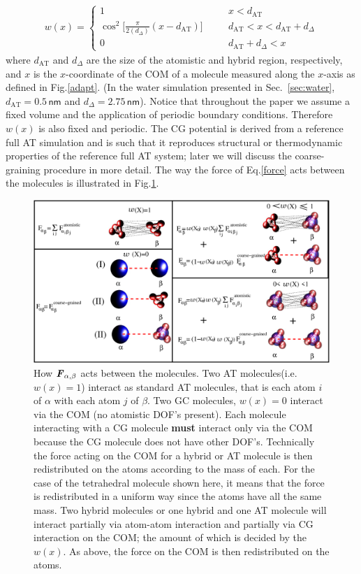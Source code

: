 \documentclass[aps,prb,preprint,citeautoscript]{revtex4}
\newcommand{\redc}[1]{{\color{black} #1}}
\renewcommand{\v}[1]{\textbf{\textit{#1}}}
\begin{document}
\begin{align}\label{eqn:old-w}
  w(x) =
  \left\{
    \begin{array}{lcl}
      1 &\quad& x < d_{\textrm{AT}}\\
      \cos^2\big[\frac{\pi}{2(d_{{\Delta}})} (x - d_{\textrm{AT}})\big] && d_{\textrm{AT}}  < x < d_{\textrm{AT}} + d_{{\Delta}} \\
      0 && d_{\textrm{AT}} + d_{{\Delta}}  < x
    \end{array}
  \right.
\end{align}
where $d_{\textrm{AT}}$ and $d_{{\Delta}}$ are the size of the
atomistic and hybrid region, respectively, and $x$ is the $x$-coordinate of the COM of a molecule measured along the $x$-axis as defined in Fig.\ref{adapt}.
\redc{(In the water simulation presented in Sec.~\ref{sec:water}, $d_{\textrm{AT}} = 0.5\, \textsf{nm}$ and $d_{\Delta} = 2.75\, \textsf{nm}$).}
\redc{Notice that throughout the paper we assume a fixed volume and the application of periodic boundary conditions. Therefore $w(x)$ is also fixed and periodic.}
The CG potential is derived from a reference full AT simulation and is such that it reproduces structural or thermodynamic properties of the reference full AT system; later we will discuss the coarse-graining procedure in more detail. The way the force of Eq.\ref{force} acts between the molecules is illustrated in Fig.\ref{inter}. 
\begin{figure}
  \centering
  \includegraphics[angle=0,width=17cm]{force.eps}
  \caption{How ${\v F}_{\alpha,\beta}$ acts between the molecules. Two AT molecules(i.e. $w(x)=1$)  interact as standard AT molecules, that is each atom $i$ of $\alpha$ with each atom $j$ of $\beta$. Two GC molecules, $w(x)=0$ interact via the COM (no atomistic DOF's present). Each molecule interacting with a CG molecule {\bf must} interact only via the COM because the CG molecule does not have other DOF's. Technically the force acting on the COM for a hybrid or AT molecule is then redistributed on the atoms according to the mass of each. For the case of the tetrahedral molecule shown here, it means that the force is redistributed in a uniform way since the atoms have all the same mass. Two hybrid molecules or one hybrid and one AT molecule will interact partially via atom-atom interaction and partially via CG interaction on the COM; the amount of which is decided by the $w(x)$. As above, the force on the COM is then redistributed on the atoms.}
  \label{inter}
\end{figure} 
\end{document}
